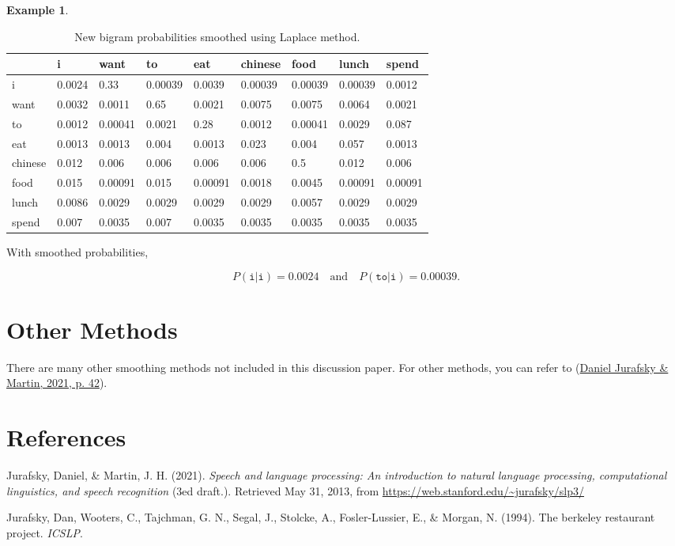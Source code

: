 \documentclass[
  12pt,
  a4paper]{article}
\newlength{\cslhangindent}
\newlength{\cslentryspacingunit} %
\newenvironment{CSLReferences}[2] %
 {%
  \setlength{\parindent}{0pt}
  \ifodd #1
  \let\oldpar\par
  \def\par{\hangindent=\cslhangindent\oldpar}
  \fi
  \setlength{\parskip}{#2\cslentryspacingunit}
 }%
 {}
\theoremstyle{definition}
\theoremstyle{definition}
\newtheorem{example}{Example}[section]
\theoremstyle{definition}
\theoremstyle{definition}
\theoremstyle{remark}
\begin{document}
\begin{example}
\begin{longtable}[t]{lllllllll}
\caption{\label{tab:bigram-smooth}New bigram probabilities smoothed using Laplace method.}\\
\toprule
  & i & want & to & eat & chinese & food & lunch & spend\\
\midrule
i & 0.0024 & 0.33 & 0.00039 & 0.0039 & 0.00039 & 0.00039 & 0.00039 & 0.0012\\
want & 0.0032 & 0.0011 & 0.65 & 0.0021 & 0.0075 & 0.0075 & 0.0064 & 0.0021\\
to & 0.0012 & 0.00041 & 0.0021 & 0.28 & 0.0012 & 0.00041 & 0.0029 & 0.087\\
eat & 0.0013 & 0.0013 & 0.004 & 0.0013 & 0.023 & 0.004 & 0.057 & 0.0013\\
chinese & 0.012 & 0.006 & 0.006 & 0.006 & 0.006 & 0.5 & 0.012 & 0.006\\
\addlinespace
food & 0.015 & 0.00091 & 0.015 & 0.00091 & 0.0018 & 0.0045 & 0.00091 & 0.00091\\
lunch & 0.0086 & 0.0029 & 0.0029 & 0.0029 & 0.0029 & 0.0057 & 0.0029 & 0.0029\\
spend & 0.007 & 0.0035 & 0.007 & 0.0035 & 0.0035 & 0.0035 & 0.0035 & 0.0035\\
\bottomrule
\end{longtable}

With smoothed probabilities,

\[P(\texttt{i}|\texttt{i}) = 0.0024\quad \text{and} \quad P(\texttt{to}|\texttt{i}) = 0.00039.\]
\end{example}

\hypertarget{other-methods}{%
\section{Other Methods}\label{other-methods}}

There are many other smoothing methods not included in this discussion paper. For other methods, you can refer to (\protect\hyperlink{ref-snlp2021}{Daniel Jurafsky \& Martin, 2021, p. 42}).

\hypertarget{references}{%
\section*{References}\label{references}}

\hypertarget{refs}{}
\begin{CSLReferences}{1}{0}
\leavevmode{}%
Jurafsky, Daniel, \& Martin, J. H. (2021). \emph{Speech and language processing: An introduction to natural language processing, computational linguistics, and speech recognition} (3ed draft.). Retrieved May 31, 2013, from \url{https://web.stanford.edu/~jurafsky/slp3/}

\leavevmode{}%
Jurafsky, Dan, Wooters, C., Tajchman, G. N., Segal, J., Stolcke, A., Fosler-Lussier, E., \& Morgan, N. (1994). The berkeley restaurant project. \emph{ICSLP}.

\end{CSLReferences}
\end{document}
